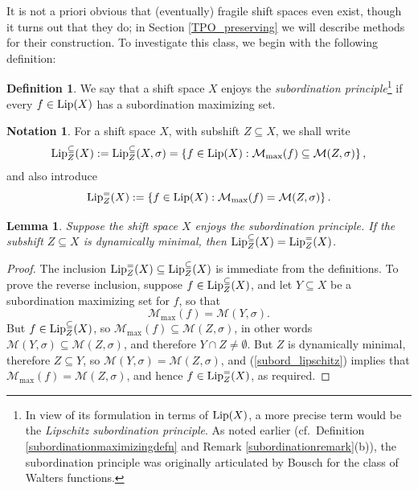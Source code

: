 \documentclass[reqno,11pt]{amsart}
\newtheorem{lem}[thm]{Lemma}
\theoremstyle{definition}
\newtheorem{defn}[thm]{Definition}
\newtheorem{notation}[thm]{Notation}
\theoremstyle{remark}
\theoremstyle{remark}
\def\m{\mathcal M}
\def\lip{{\rm Lip}}
\numberwithin{equation}{section}
\begin{document}
It is not a priori obvious that (eventually) fragile shift spaces even exist, though it turns out that they do;
in Section \ref{TPO_preserving} we will describe methods for their construction.
To investigate this class, we begin with the following definition:

\begin{defn}\label{lipschitz_subordination_principle}
We say that a shift space $X$ enjoys the 
\emph{subordination principle}\footnote{In view of its formulation in terms of $\lip(X)$, a more precise term would be the \emph{Lipschitz subordination principle}. As noted earlier (cf.~Definition \ref{subordinationmaximizingdefn} and Remark \ref{subordinationremark}(b)), the subordination principle was originally articulated by Bousch \cite{B01} for the class of Walters functions.}
if every $f\in\lip(X)$ has a subordination maximizing set.
\end{defn}

\begin{notation}
For a shift space $X$, with subshift $Z\subseteq X$, we shall write
$$
\lip^\subseteq_Z(X)
:=
\lip^\subseteq_Z(X,\sigma)
=
\left\{f\in \lip(X): \m_{\max}(f) \subseteq \m(Z,\sigma)\right\},
$$
and also introduce
$$
\lip^=_Z(X):=\left\{f\in \lip(X): \m_{\max}(f)=\m(Z,\sigma)\right\}.
$$
\end{notation}

\begin{lem}\label{subordination_minimal_equality}
Suppose the shift space $X$ enjoys the subordination principle.
If the subshift $Z\subseteq X$ is dynamically minimal, then $\lip^\subseteq_Z(X)= \lip^=_Z(X)$.
\end{lem}
\begin{proof}
The inclusion $\lip^=_Z(X) \subseteq \lip^\subseteq_Z(X)$ is immediate from the definitions.
To prove the reverse inclusion, suppose $f\in \lip^\subseteq_Z(X)$, and let $Y\subseteq X$ be a subordination maximizing set for $f$, so that 
\begin{equation}\label{subord_lipschitz}
\m_{\max}(f) = \m(Y,\sigma).
\end{equation}
But $f\in \lip^\subseteq_Z(X)$, so $\m_{\max}(f) \subseteq \m(Z,\sigma)$, in other words
$\m(Y,\sigma)\subseteq \m(Z,\sigma)$, and therefore $Y\cap Z \neq \emptyset$.
But $Z$ is dynamically minimal, therefore $Z\subseteq Y$, so $\m(Y,\sigma)=\m(Z,\sigma)$, and
(\ref{subord_lipschitz}) implies that $\m_{\max}(f) = \m(Z,\sigma)$, and hence $f\in\lip^=_Z(X)$, as required.
\end{proof}
\end{document}
